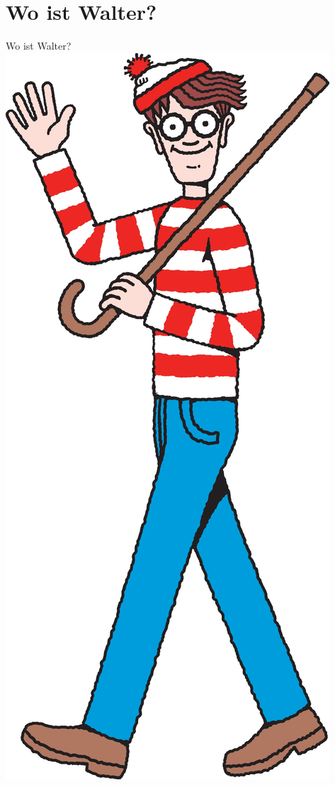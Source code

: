 \documentclass[12pt,compress,ngerman,utf8,t]{beamer}
\begin{document}
\section{Wo ist Walter?}

\begin{frame}{Wo ist Walter?}
  \centering
  \includegraphics[height=0.8\textheight]{waldo}
\end{frame}
\end{document}
